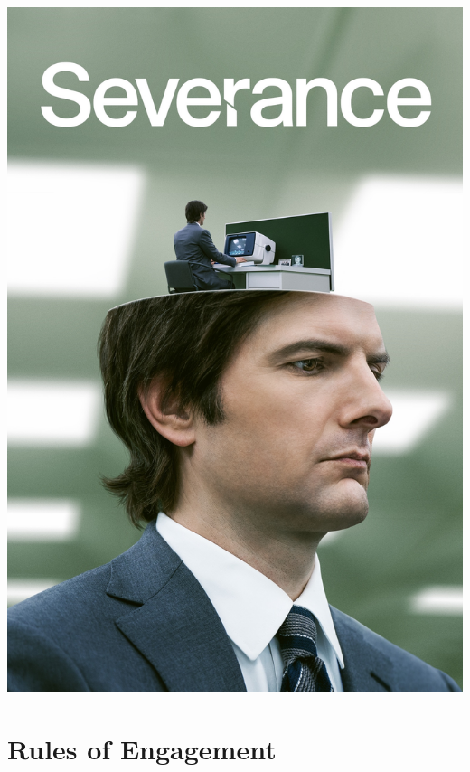 \documentclass{beamer}
\begin{document}
\begin{frame}
{\begin{center}
            \includegraphics[width = .5\textwidth]{severance.jpg}
        \end{center}
    }
\end{frame}

\section{Rules of Engagement}
\end{document}
